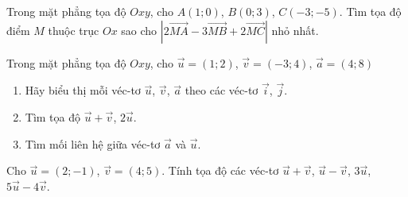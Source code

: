 \begin{vd}%
	Trong mặt phẳng tọa độ $ Oxy$, cho $ A(1;0)$, $ B(0;3)$, $ C(-3;-5)$. Tìm tọa độ điểm $ M$ thuộc trục $ Ox$ sao cho $\left|2\vec{MA}-3\vec{MB}+2\vec{MC}\right|$ nhỏ nhất.
\end{vd}

\begin{baitap}%
	Trong mặt phẳng tọa độ $Oxy$, cho $\vec{u}=(1;2)$, $\vec{v}=(-3;4)$, $\vec{a}=(4;8)$
	\begin{enumerate}
		\item Hãy biểu  thị mỗi véc-tơ $\vec{u}$, $\vec{v}$, $\vec{a}$ theo các véc-tơ $\vec{i}$, $\vec{j}$.
		\item Tìm tọa độ $\vec{u}+\vec{v}$, $2\vec{u}$.
		\item Tìm mối liên hệ giữa véc-tơ $\vec{a}$ và $\vec{u}$.
	\end{enumerate}
\end{baitap}
\begin{baitap}%
	Cho $\vec{u}=(2;-1)$, $\vec{v}=(4;5)$. Tính tọa độ các véc-tơ $\vec{u}+\vec{v}$, $\vec{u}-\vec{v}$, $3\vec{u}$, $5\vec{u}-4\vec{v}$.
\end{baitap}

